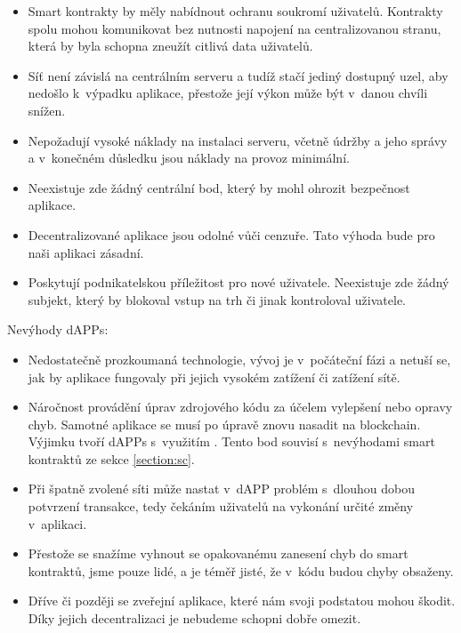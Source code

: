 \begin{itemize}
\item Smart kontrakty by měly nabídnout ochranu soukromí uživatelů. Kontrakty spolu mohou komunikovat bez nutnosti napojení na centralizovanou stranu, která by byla schopna zneužít citlivá data uživatelů.

\item Síť není závislá na centrálním serveru a tudíž stačí jediný dostupný uzel, aby nedošlo k~výpadku aplikace, přestože její výkon může být v~danou chvíli snížen.

\item Nepožadují vysoké náklady na instalaci serveru, včetně údržby a jeho správy a v~konečném důsledku jsou náklady na provoz minimální.

\item Neexistuje zde žádný centrální bod, který by mohl ohrozit bezpečnost aplikace. 

\item Decentralizované aplikace jsou odolné vůči cenzuře. Tato výhoda bude pro naši aplikaci zásadní.

\item Poskytují podnikatelskou příležitost pro nové uživatele. Neexistuje zde žádný subjekt, který by blokoval vstup na trh či jinak kontroloval uživatele.
\end{itemize}

Nevýhody dAPPs:
\begin{itemize}
\item Nedostatečně prozkoumaná technologie, vývoj je v~počáteční fázi a netuší se, jak by aplikace fungovaly při jejich vysokém zatížení či zatížení sítě.

\item Náročnost provádění úprav zdrojového kódu za účelem vylepšení nebo opravy chyb. Samotné aplikace se musí po úpravě znovu nasadit na blockchain. Výjimku tvoří dAPPs s~využitím . Tento bod souvisí s~nevýhodami smart kontraktů ze sekce \ref{section:sc}.

\item Při špatně zvolené síti může nastat v~dAPP problém s~dlouhou dobou potvrzení transakce, tedy čekáním uživatelů na vykonání určité změny v~aplikaci.

\item Přestože se snažíme vyhnout se opakovanému zanesení chyb do smart kontraktů, jsme pouze lidé, a je téměř jisté, že v~kódu budou chyby obsaženy.

\item Dříve či později se zveřejní aplikace, které nám svoji podstatou mohou škodit. Díky jejich decentralizaci je nebudeme schopni dobře omezit.
\end{itemize}


